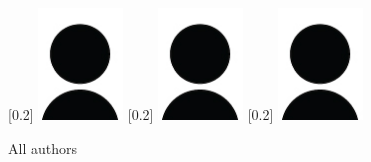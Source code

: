 \begin{figure}
\centering
{}[0.2\textwidth]{%
    \includegraphics[width=0.2\textwidth]{figs/author}}%
\hspace{0.1\textwidth} %
[0.2\textwidth]{%
    \includegraphics[width=0.2\textwidth]{figs/author}}%
\hspace{0.1\textwidth} %
[0.2\textwidth]{%
    \includegraphics[width=0.2\textwidth]{figs/author}}%
\caption{All authors}
\label{fig:a9:allauthors}
\end{figure}